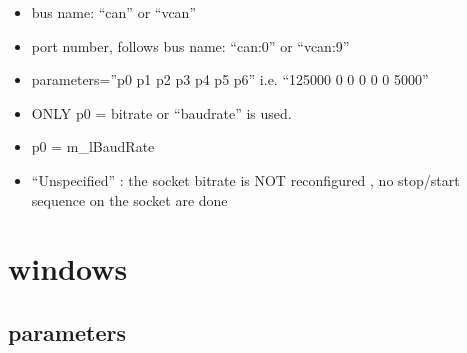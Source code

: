 \documentclass[a4paper,10pt,english]{sphinxmanual}
\begin{document}
\begin{itemize}
\item {} 
\sphinxAtStartPar
bus name: “can” or “vcan”

\item {} 
\sphinxAtStartPar
port number, follows bus name: “can:0” or “vcan:9”

\item {} 
\sphinxAtStartPar
parameters=”p0 p1 p2 p3 p4 p5 p6” i.e. “125000 0 0 0 0 0 5000”

\item {} 
\sphinxAtStartPar
ONLY p0 = bitrate or “baudrate” is used.

\item {} 
\sphinxAtStartPar
p0 = m\_lBaudRate

\item {} 
\sphinxAtStartPar
“Unspecified” : the socket bitrate is NOT reconfigured , no stop/start sequence on the socket are done

\end{itemize}


\section{windows}
\label{\detokenize{vendors/systec:windows}}

\subsection{parameters}
\label{\detokenize{vendors/systec:id1}}
\end{document}
